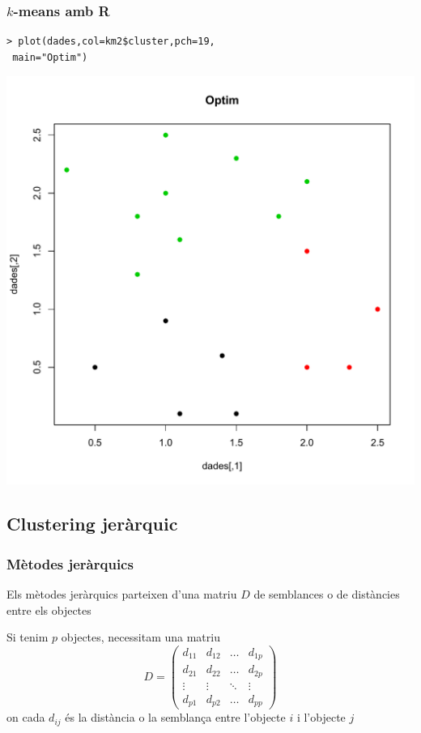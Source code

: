 \documentclass[12pt,t]{beamer}
\theoremstyle{plain}
\theoremstyle{definition}
\begin{document}
\begin{frame}[fragile]
\frametitle{$k$-means amb R}
\footnotesize
\begin{verbatim}
> plot(dades,col=km2$cluster,pch=19,
 main="Optim")
\end{verbatim}
\vspace*{-3ex}

\begin{center}
\includegraphics[width=0.7 \linewidth]{Rplot52.pdf}
\end{center}

\end{frame}


%
% 
%
%


\subsection{Clustering jeràrquic}

\begin{frame}
\frametitle{Mètodes jeràrquics}

Els mètodes jeràrquics parteixen d'una matriu $D$ de semblances o de  distàncies entre els objectes
\medskip

Si tenim $p$ objectes, necessitam una matriu
$$
D=\left(\begin{array}{cccc}
d_{11} & d_{12} & \ldots & d_{1p}\\
d_{21} & d_{22} & \ldots & d_{2p}\\
\vdots & \vdots & \ddots & \vdots\\
d_{p1} & d_{p2} & \ldots & d_{pp}
\end{array}
\right)
$$
on cada $d_{ij}$ és la distància o la semblança entre l'objecte $i$ i l'objecte $j$
\end{frame}
\end{document}
